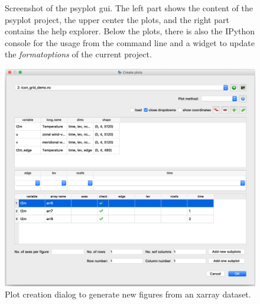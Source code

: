 \documentclass[
11pt, %
english, %
singlespacing, %
headsepline, %
]{article} %
\begin{document}
\begin{refsection}
\begin{figure}
	\caption[Screenshot of the psyplot GUI]{Screenshot of the psyplot \gls{gui}. The left part shows the content of the psyplot project, the upper center the plots, and the right part contains the help explorer. Below the plots, there is also the IPython console for the usage from the command line and a widget to update the \textit{formatoptions} of the current project.}
	\label{fig:psyplot-gui}
\end{figure}

\begin{figure}
	\centering
	\includegraphics[width=0.7\linewidth]{psyplot-figures/plot-creator.png}
	\caption[psyplot Gui plot creation dialog]{Plot creation dialog to generate new figures from an xarray dataset.}
	\label{fig:psyplot-gui-plot-creator}
\end{figure}


\end{refsection}
\end{document}
